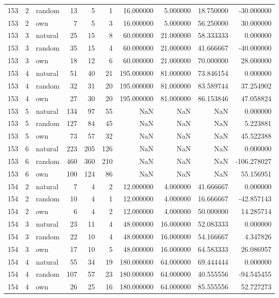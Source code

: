 \begin{table}[htbp]
\begin{tabular}{rrlrrrrrrr}
153 & 2 & random & 13 & 5 & 1 & 16.000000 & 5.000000 & 18.750000 & -30.000000 \\
153 & 2 & own & 7 & 5 & 3 & 16.000000 & 5.000000 & 56.250000 & 30.000000 \\
153 & 3 & natural & 25 & 15 & 8 & 60.000000 & 21.000000 & 58.333333 & 0.000000 \\
153 & 3 & random & 35 & 15 & 4 & 60.000000 & 21.000000 & 41.666667 & -40.000000 \\
153 & 3 & own & 18 & 12 & 6 & 60.000000 & 21.000000 & 70.000000 & 28.000000 \\
153 & 4 & natural & 51 & 40 & 21 & 195.000000 & 81.000000 & 73.846154 & 0.000000 \\
153 & 4 & random & 32 & 31 & 20 & 195.000000 & 81.000000 & 83.589744 & 37.254902 \\
153 & 4 & own & 27 & 30 & 20 & 195.000000 & 81.000000 & 86.153846 & 47.058824 \\
153 & 5 & natural & 134 & 97 & 55 & NaN & NaN & NaN & 0.000000 \\
153 & 5 & random & 127 & 84 & 45 & NaN & NaN & NaN & 5.223881 \\
153 & 5 & own & 73 & 57 & 32 & NaN & NaN & NaN & 45.522388 \\
153 & 6 & natural & 223 & 205 & 126 & NaN & NaN & NaN & 0.000000 \\
153 & 6 & random & 460 & 360 & 210 & NaN & NaN & NaN & -106.278027 \\
153 & 6 & own & 100 & 124 & 86 & NaN & NaN & NaN & 55.156951 \\
154 & 2 & natural & 7 & 4 & 2 & 12.000000 & 4.000000 & 41.666667 & 0.000000 \\
154 & 2 & random & 10 & 4 & 1 & 12.000000 & 4.000000 & 16.666667 & -42.857143 \\
154 & 2 & own & 6 & 4 & 2 & 12.000000 & 4.000000 & 50.000000 & 14.285714 \\
154 & 3 & natural & 23 & 11 & 4 & 48.000000 & 16.000000 & 52.083333 & 0.000000 \\
154 & 3 & random & 22 & 10 & 4 & 48.000000 & 16.000000 & 54.166667 & 4.347826 \\
154 & 3 & own & 17 & 10 & 5 & 48.000000 & 16.000000 & 64.583333 & 26.086957 \\
154 & 4 & natural & 55 & 34 & 19 & 180.000000 & 64.000000 & 69.444444 & 0.000000 \\
154 & 4 & random & 107 & 57 & 23 & 180.000000 & 64.000000 & 40.555556 & -94.545455 \\
154 & 4 & own & 26 & 25 & 16 & 180.000000 & 64.000000 & 85.555556 & 52.727273 \\

\end{tabular}
\end{table}
